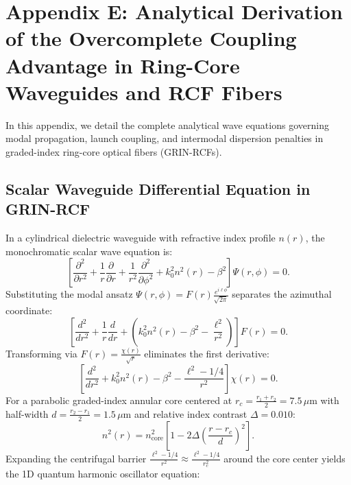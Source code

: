 \documentclass{optica-article}
\begin{document}
\section{Appendix E: Analytical Derivation of the Overcomplete Coupling Advantage in Ring-Core Waveguides and RCF Fibers}
\label{app:waveguide}

In this appendix, we detail the complete analytical wave equations governing modal propagation, launch coupling, and intermodal dispersion penalties in graded-index ring-core optical fibers (GRIN-RCFs).

\subsection{Scalar Waveguide Differential Equation in GRIN-RCF}

In a cylindrical dielectric waveguide with refractive index profile $n(r)$, the monochromatic scalar wave equation is:
\begin{equation}
\left[ \frac{\partial^2}{\partial r^2} + \frac{1}{r} \frac{\partial}{\partial r} + \frac{1}{r^2} \frac{\partial^2}{\partial \phi^2} + k_0^2 n^2(r) - \beta^2 \right] \Psi(r, \phi) = 0.
\label{eq:app_scalar_helmholtz}
\end{equation}
Substituting the modal ansatz $\Psi(r, \phi) = F(r) \frac{e^{i \ell \phi}}{\sqrt{2\pi}}$ separates the azimuthal coordinate:
\begin{equation}
\left[ \frac{d^2}{dr^2} + \frac{1}{r} \frac{d}{dr} + \left( k_0^2 n^2(r) - \beta^2 - \frac{\ell^2}{r^2} \right) \right] F(r) = 0.
\label{eq:app_radial_helmholtz}
\end{equation}
Transforming via $F(r) = \frac{\chi(r)}{\sqrt{r}}$ eliminates the first derivative:
\begin{equation}
\left[ \frac{d^2}{dr^2} + k_0^2 n^2(r) - \beta^2 - \frac{\ell^2 - 1/4}{r^2} \right] \chi(r) = 0.
\label{eq:app_chi_equation}
\end{equation}
For a parabolic graded-index annular core centered at $r_c = \frac{r_1 + r_2}{2} = 7.5\,\mu\text{m}$ with half-width $d = \frac{r_2 - r_1}{2} = 1.5\,\mu\text{m}$ and relative index contrast $\Delta = 0.010$:
\begin{equation}
n^2(r) = n_{\text{core}}^2 \left[ 1 - 2\Delta \left( \frac{r - r_c}{d} \right)^2 \right].
\label{eq:app_parabolic_profile}
\end{equation}
Expanding the centrifugal barrier $\frac{\ell^2 - 1/4}{r^2} \approx \frac{\ell^2 - 1/4}{r_c^2}$ around the core center yields the 1D quantum harmonic oscillator equation:
\end{document}
